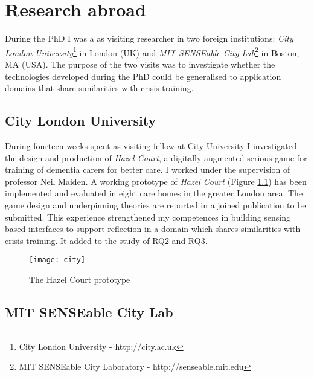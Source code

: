 \chapter{Research abroad}\label{abroad}

During the PhD I was a as visiting researcher in two foreign institutions: \emph{City London University}\footnote{City London University - http://city.ac.uk} in London (UK) and \emph{MIT SENSEable City Lab}\footnote{MIT SENSEable City Laboratory - http://senseable.mit.edu} in Boston, MA (USA). The purpose of the two visits was to investigate whether the technologies developed during the PhD could be generalised to application domains that share similarities with crisis training.

\section{City London University}

During fourteen weeks spent as visiting fellow at City University I investigated the design and production of \emph{Hazel Court}, a digitally augmented serious game for training of dementia carers for better care. I worked under the supervision of professor Neil Maiden. A working prototype of \emph{Hazel Court} (Figure \ref{fig:hazel-court}) has been implemented and evaluated in eight care homes in the greater London area. The game design and underpinning theories are reported in a joined publication to be submitted. This experience strengthened my competences in building sensing based-interfaces to support reflection in a domain which shares similarities with crisis training. It added to the study of RQ2 and RQ3.
\begin{figure}
	[h] \centering 
	\texttt{[image: city]} \caption{The Hazel Court prototype} \label{fig:hazel-court} 
\end{figure}

\section{MIT SENSEable City Lab}

